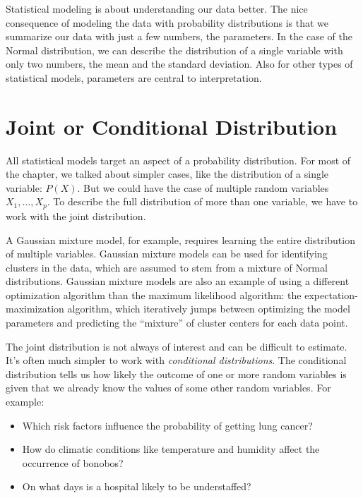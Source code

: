 \documentclass[
  10pt,
]{scrbook}
\providecommand{\tightlist}{%
  \setlength{\itemsep}{0pt}\setlength{\parskip}{0pt}}
\begin{document}
Statistical modeling is about understanding our data better.
The nice consequence of modeling the data with probability distributions is that we summarize our data with just a few numbers, the parameters.
In the case of the Normal distribution, we can describe the distribution of a single variable with only two numbers, the mean and the standard deviation.
Also for other types of statistical models, parameters are central to interpretation.

\hypertarget{joint-or-conditional-distribution}{%
\section{Joint or Conditional Distribution}\label{joint-or-conditional-distribution}}

All statistical models target an aspect of a probability distribution.
For most of the chapter, we talked about simpler cases, like the distribution of a single variable: \(P(X)\).
But we could have the case of multiple random variables \(X_1, \ldots, X_p\).
To describe the full distribution of more than one variable, we have to work with the joint distribution.

A Gaussian mixture model, for example, requires learning the entire distribution of multiple variables.
Gaussian mixture models can be used for identifying clusters in the data, which are assumed to stem from a mixture of Normal distributions.
Gaussian mixture models are also an example of using a different optimization algorithm than the maximum likelihood algorithm: the expectation-maximization algorithm, which iteratively jumps between optimizing the model parameters and predicting the ``mixture'' of cluster centers for each data point.

The joint distribution is not always of interest and can be difficult to estimate.
It's often much simpler to work with \emph{conditional distributions}.
The conditional distribution tells us how likely the outcome of one or more random variables is given that we already know the values of some other random variables.
For example:

\begin{itemize}
\tightlist
\item
  Which risk factors influence the probability of getting lung cancer?
\item
  How do climatic conditions like temperature and humidity affect the occurrence of bonobos?
\item
  On what days is a hospital likely to be understaffed?
\end{itemize}
\end{document}

